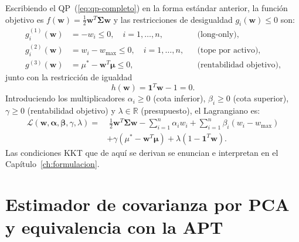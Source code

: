 Escribiendo el QP~(\ref{eq:qp-completo}) en la forma estándar anterior, la
función objetivo es $f(\mathbf{w}) = \frac{1}{2}\mathbf{w}^T \boldsymbol{\Sigma}
\mathbf{w}$ y las restricciones de desigualdad $g_i(\mathbf{w}) \le 0$ son:
\begin{align}
    g_i^{(1)}(\mathbf{w}) &= -w_i \le 0, \quad i = 1, \dots, n,
        &&\text{(long-only)}, \label{eq:g1} \\
    g_i^{(2)}(\mathbf{w}) &= w_i - w_{\max} \le 0, \quad i = 1, \dots, n,
        &&\text{(tope por activo)}, \label{eq:g2} \\
    g^{(3)}(\mathbf{w}) &= \mu^* - \mathbf{w}^T \boldsymbol{\mu} \le 0,
        &&\text{(rentabilidad objetivo)}, \label{eq:g3}
\end{align}
junto con la restricción de igualdad
\begin{equation}
    h(\mathbf{w}) = \mathbf{1}^T \mathbf{w} - 1 = 0. \label{eq:h}
\end{equation}
Introduciendo los multiplicadores $\alpha_i \ge 0$ (cota inferior),
$\beta_i \ge 0$ (cota superior), $\gamma \ge 0$ (rentabilidad objetivo) y
$\lambda \in \mathbb{R}$ (presupuesto), el Lagrangiano es:
\begin{equation}
    \begin{aligned}
        \mathcal{L}(\mathbf{w}, \boldsymbol{\alpha}, \boldsymbol{\beta},
        \gamma, \lambda)
        =& \; \frac{1}{2} \mathbf{w}^T \boldsymbol{\Sigma} \mathbf{w}
           - \sum_{i=1}^{n} \alpha_i w_i
           + \sum_{i=1}^{n} \beta_i (w_i - w_{\max}) \\
        & + \gamma (\mu^* - \mathbf{w}^T \boldsymbol{\mu})
           + \lambda (1 - \mathbf{1}^T \mathbf{w}).
    \end{aligned}
    \label{eq:lagrangiano-qp}
\end{equation}
Las condiciones KKT que de aquí se derivan se enuncian e interpretan en el
Capítulo~\ref{ch:formulacion}.

\section{Estimador de covarianza por PCA y equivalencia con la APT}
\label{ap:pca-apt}

